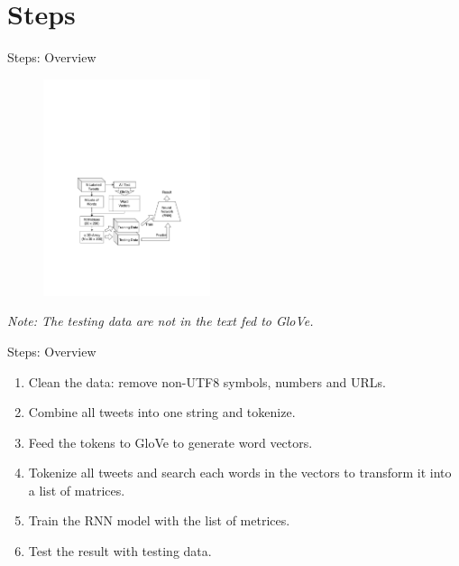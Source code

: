 \documentclass{beamer}
\begin{document}
\section{Steps}%
\label{sec:steps}

\begin{frame}{Steps: Overview}
    \begin{figure}[h]
	    \includegraphics[trim={2cm 6cm 0 12.5cm},clip,height=2.5in]{img/flow_chart.pdf}
        \label{fig:flowchart}
    \end{figure}
    \textit{Note: The testing data are not in the text fed to GloVe.}
\end{frame}

\begin{frame}{Steps: Overview}
	\begin{enumerate}
		\item Clean the data: remove non-UTF8 symbols, numbers and URLs.
		\item Combine all tweets into one string and tokenize.
		\item Feed the tokens to GloVe to generate word vectors.
		\item Tokenize all tweets and search each words in the vectors to transform it into a list of matrices.
		\item Train the RNN model with the list of metrices.
		\item Test the result with testing data.
	\end{enumerate}	
\end{frame}
\end{document}
